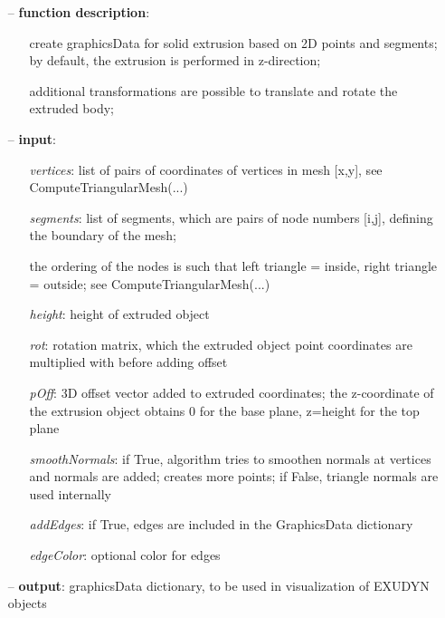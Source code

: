 \begin{itemize}[leftmargin=1.4cm]
\begin{itemize}[leftmargin=1.4cm]
\begin{itemize}[leftmargin=0.5cm]
\begin{itemize}[leftmargin=1.4cm]
\begin{itemize}[leftmargin=1.4cm]
\begin{itemize}[leftmargin=0.5cm]
\begin{itemize}[leftmargin=1.4cm]
\begin{itemize}[leftmargin=0.5cm]
\begin{flushleft}
\end{flushleft}
\setlength{\itemindent}{0.7cm}
\begin{itemize}[leftmargin=0.7cm]
  \item[--]  {\bf function description}: \vspace{-6pt}
  \begin{itemize}[leftmargin=1.2cm]
\setlength{\itemindent}{-0.7cm}
    \item[] create graphicsData for solid extrusion based on 2D points and segments; by default, the extrusion is performed in z-direction;
    \item[]             additional transformations are possible to translate and rotate the extruded body;
  \end{itemize}
  \item[--]  {\bf input}: \vspace{-6pt}
  \begin{itemize}[leftmargin=1.2cm]
\setlength{\itemindent}{-0.7cm}
    \item[] {\it vertices}: list of pairs of coordinates of vertices in mesh [x,y], see ComputeTriangularMesh(...)
    \item[] {\it   segments}: list of segments, which are pairs of node numbers [i,j], defining the boundary of the mesh;
    \item[]             the ordering of the nodes is such that left triangle = inside, right triangle = outside; see ComputeTriangularMesh(...)
    \item[] {\it   height}:   height of extruded object
    \item[] {\it   rot}:      rotation matrix, which the extruded object point coordinates are multiplied with before adding offset
    \item[] {\it   pOff}:     3D offset vector added to extruded coordinates; the z-coordinate of the extrusion object obtains 0 for the base plane, z=height for the top plane
    \item[] {\it   smoothNormals}: if True, algorithm tries to smoothen normals at vertices and normals are added; creates more points; if False, triangle normals are used internally
    \item[] {\it   addEdges}: if True, edges are included in the GraphicsData dictionary
    \item[] {\it   edgeColor}: optional color for edges
  \end{itemize}
  \item[--]  {\bf output}: graphicsData dictionary, to be used in visualization of EXUDYN objects\vspace{12pt}\end{itemize}

\end{itemize}
\end{itemize}
\end{itemize}
\end{itemize}
\end{itemize}
\end{itemize}
\end{itemize}
\end{itemize}
